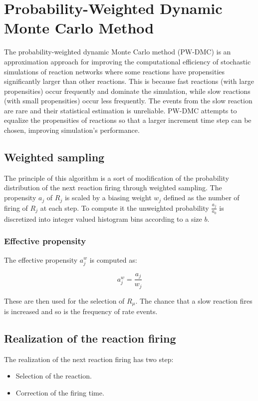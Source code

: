 \section{Probability-Weighted Dynamic Monte Carlo Method}
The probability-weighted dynamic Monte Carlo method (PW-DMC) is an approximation approach for improving the computational efficiency of stochastic simulations of reaction networks where some reactions have propensities significantly larger than other reactions.
This is because fast reactions (with large propensities) occur frequently and dominate the simulation, while slow reactions (with small propensities) occur less frequently.
The events from the slow reaction are rare and their statistical estimation is unreliable.
PW-DMC attempts to equalize the propensities of reactions so that a larger increment time step can be chosen, improving simulation's performance.

  \subsection{Weighted sampling}
  The principle of this algorithm is a sort of modification of the probability distribution of the next reaction firing through weighted sampling.
  The propensity $a_j$ of $R_j$ is scaled by a biasing weight $w_j$ defined as the number of firing of $R_j$ at each step.
  To compute it the unweighted probability $\frac{a_j}{a_0}$ is discretized into integer valued histogram bins according to a size $b$.

    \subsubsection{Effective propensity}
    The effective propensity $a^w_j$ is computed as:

    $$a^w_j = \frac{a_j}{w_j}$$

    These are then used for the selection of $R_\mu$.
    The chance that a slow reaction fires is increased and so is the frequency of rate events.

  \subsection{Realization of the reaction firing}
  The realization of the next reaction firing has two step:

  \begin{multicols}{2}
    \begin{itemize}
      \item Selection of the reaction.
      \item Correction of the firing time.
    \end{itemize}
  \end{multicols}

